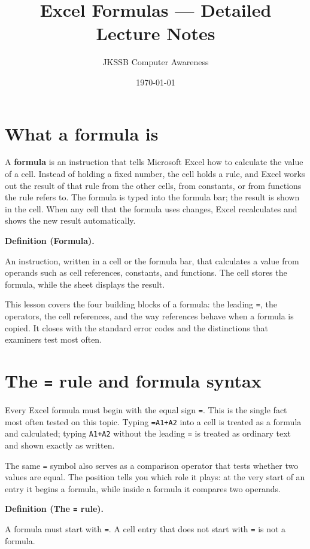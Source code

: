 \documentclass[11pt]{article}
\title{Excel Formulas --- Detailed Lecture Notes}
\author{JKSSB Computer Awareness}
\date{\today}
\newenvironment{definitionbox}[1]{%
  \par\noindent\textbf{Definition (#1).}\ \itshape
}{\par\vspace{0.3em}}
\begin{document}
\maketitle

\section{What a formula is}
A \textbf{formula} is an instruction that tells Microsoft Excel how to
calculate the value of a cell. Instead of holding a fixed number, the cell
holds a rule, and Excel works out the result of that rule from the other
cells, from constants, or from functions the rule refers to. The formula is
typed into the formula bar; the result is shown in the cell. When any cell
that the formula uses changes, Excel recalculates and shows the new result
automatically.

\begin{definitionbox}{Formula}
An instruction, written in a cell or the formula bar, that calculates a value
from operands such as cell references, constants, and functions. The cell
stores the formula, while the sheet displays the result.
\end{definitionbox}

This lesson covers the four building blocks of a formula: the leading
\texttt{=}, the operators, the cell references, and the way references behave
when a formula is copied. It closes with the standard error codes and the
distinctions that examiners test most often.

\section{The \texttt{=} rule and formula syntax}
Every Excel formula must begin with the equal sign \texttt{=}. This is the
single fact most often tested on this topic. Typing \texttt{=A1+A2} into a
cell is treated as a formula and calculated; typing \texttt{A1+A2} without the
leading \texttt{=} is treated as ordinary text and shown exactly as written.

The same \texttt{=} symbol also serves as a comparison operator that tests
whether two values are equal. The position tells you which role it plays: at
the very start of an entry it begins a formula, while inside a formula it
compares two operands.

\begin{definitionbox}{The \texttt{=} rule}
A formula must start with \texttt{=}. A cell entry that does not start with
\texttt{=} is not a formula.
\end{definitionbox}
\end{document}
